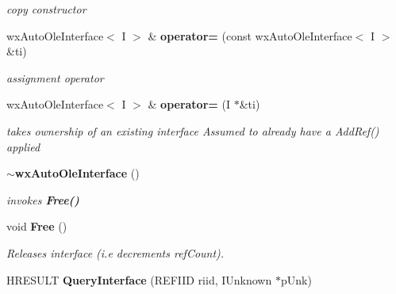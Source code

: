 \begin{CompactItemize}
\begin{CompactList}\small\item\em copy constructor\item\end{CompactList}\item 
{}
wx\-Auto\-Ole\-Interface$<$ I $>$ \& {\bf operator=} (const wx\-Auto\-Ole\-Interface$<$ I $>$ \&ti)\label{classwxAutoOleInterface_a5}

\begin{CompactList}\small\item\em assignment operator\item\end{CompactList}\item 
{}
wx\-Auto\-Ole\-Interface$<$ I $>$ \& {\bf operator=} (I $\ast$\&ti)\label{classwxAutoOleInterface_a6}

\begin{CompactList}\small\item\em takes ownership of an existing interface Assumed to already have a Add\-Ref() applied\item\end{CompactList}\item 
{}
{\bf $\sim$wx\-Auto\-Ole\-Interface} ()\label{classwxAutoOleInterface_a7}

\begin{CompactList}\small\item\em invokes {\bf Free()}\item\end{CompactList}\item 
{}
void {\bf Free} ()\label{classwxAutoOleInterface_a8}

\begin{CompactList}\small\item\em Releases interface (i.e decrements ref\-Count).\item\end{CompactList}\item 
{}
HRESULT {\bf Query\-Interface} (REFIID riid, IUnknown $\ast$p\-Unk)\label{classwxAutoOleInterface_a9}


\end{CompactItemize}
